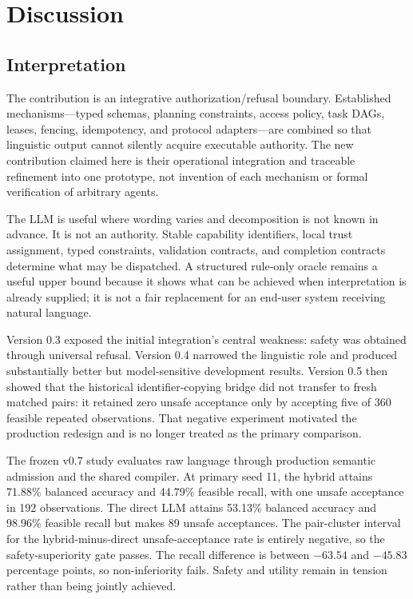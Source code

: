 \chapter{Discussion}
\label{chap:discussion}

\section{Interpretation}

The contribution is an integrative authorization/refusal boundary. Established mechanisms---typed schemas, planning constraints, access policy, task DAGs, leases, fencing, idempotency, and protocol adapters---are combined so that linguistic output cannot silently acquire executable authority. The new contribution claimed here is their operational integration and traceable refinement into one prototype, not invention of each mechanism or formal verification of arbitrary agents.

The LLM is useful where wording varies and decomposition is not known in advance. It is not an authority. Stable capability identifiers, local trust assignment, typed constraints, validation contracts, and completion contracts determine what may be dispatched. A structured rule-only oracle remains a useful upper bound because it shows what can be achieved when interpretation is already supplied; it is not a fair replacement for an end-user system receiving natural language.

Version 0.3 exposed the initial integration's central weakness: safety was obtained through universal refusal. Version 0.4 narrowed the linguistic role and produced substantially better but model-sensitive development results. Version 0.5 then showed that the historical identifier-copying bridge did not transfer to fresh matched pairs: it retained zero unsafe acceptance only by accepting five of 360 feasible repeated observations. That negative experiment motivated the production redesign and is no longer treated as the primary comparison.

The frozen v0.7 study evaluates raw language through production semantic admission and the shared compiler. At primary seed 11, the hybrid attains 71.88\% balanced accuracy and 44.79\% feasible recall, with one unsafe acceptance in 192 observations. The direct LLM attains 53.13\% balanced accuracy and 98.96\% feasible recall but makes 89 unsafe acceptances. The pair-cluster interval for the hybrid-minus-direct unsafe-acceptance rate is entirely negative, so the safety-superiority gate passes. The recall difference is between $-63.54$ and $-45.83$ percentage points, so non-inferiority fails. Safety and utility remain in tension rather than being jointly achieved.

